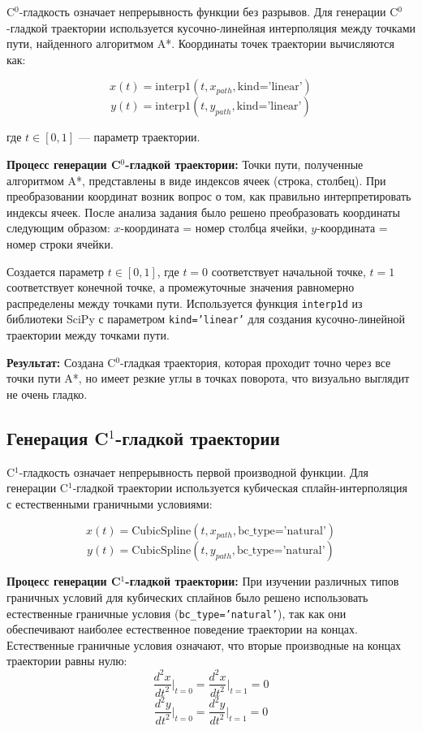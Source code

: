 C$^0$-гладкость означает непрерывность функции без разрывов. Для генерации C$^0$-гладкой траектории используется кусочно-линейная интерполяция между точками пути, найденного алгоритмом A*. Координаты точек траектории вычисляются как:

$$x(t) = \text{interp1}(t, x_{path}, \text{kind='linear'})$$
$$y(t) = \text{interp1}(t, y_{path}, \text{kind='linear'})$$

где $t \in [0, 1]$ --- параметр траектории.

\textbf{Процесс генерации C$^0$-гладкой траектории:} Точки пути, полученные алгоритмом A*, представлены в виде индексов ячеек (строка, столбец). При преобразовании координат возник вопрос о том, как правильно интерпретировать индексы ячеек. После анализа задания было решено преобразовать координаты следующим образом: $x$-координата = номер столбца ячейки, $y$-координата = номер строки ячейки. 

Создается параметр $t \in [0, 1]$, где $t = 0$ соответствует начальной точке, $t = 1$ соответствует конечной точке, а промежуточные значения равномерно распределены между точками пути. Используется функция \texttt{interp1d} из библиотеки SciPy с параметром \texttt{kind='linear'} для создания кусочно-линейной траектории между точками пути.

\textbf{Результат:} Создана C$^0$-гладкая траектория, которая проходит точно через все точки пути A*, но имеет резкие углы в точках поворота, что визуально выглядит не очень гладко.

\subsection{Генерация C$^1$-гладкой траектории}

C$^1$-гладкость означает непрерывность первой производной функции. Для генерации C$^1$-гладкой траектории используется кубическая сплайн-интерполяция с естественными граничными условиями:

$$x(t) = \text{CubicSpline}(t, x_{path}, \text{bc\_type='natural'})$$
$$y(t) = \text{CubicSpline}(t, y_{path}, \text{bc\_type='natural'})$$

\textbf{Процесс генерации C$^1$-гладкой траектории:} При изучении различных типов граничных условий для кубических сплайнов было решено использовать естественные граничные условия (\texttt{bc\_type='natural'}), так как они обеспечивают наиболее естественное поведение траектории на концах. Естественные граничные условия означают, что вторые производные на концах траектории равны нулю:
$$\frac{d^2x}{dt^2}\bigg|_{t=0} = \frac{d^2x}{dt^2}\bigg|_{t=1} = 0$$
$$\frac{d^2y}{dt^2}\bigg|_{t=0} = \frac{d^2y}{dt^2}\bigg|_{t=1} = 0$$

